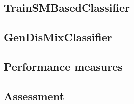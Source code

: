 \subsection{TrainSMBasedClassifier}
\subsection{GenDisMixClassifier}
\subsection{Performance measures}
\subsection{Assessment}
